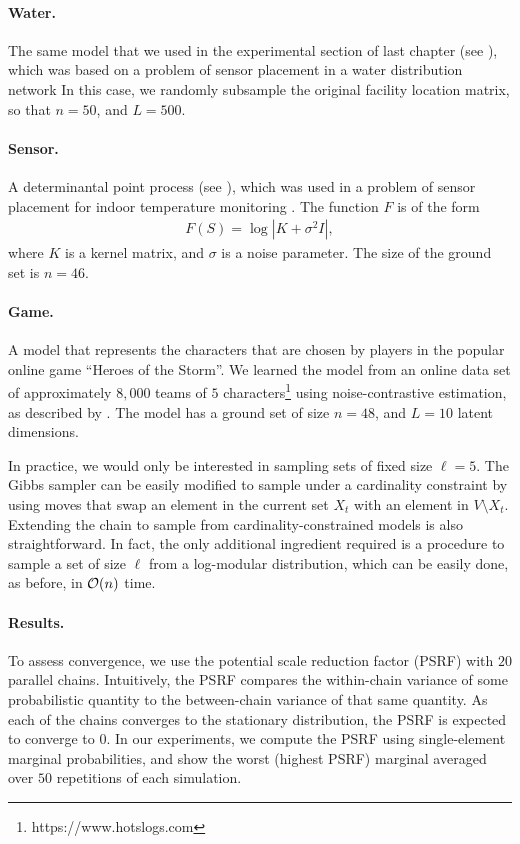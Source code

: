 \paragraph{\textsf{Water}.} The same \flid{} model that we used in the experimental section of last chapter (see ), which was based on a problem of sensor placement in a water distribution network \citep{krause08}
In this case, we randomly subsample the original facility location matrix, so that $n = 50$, and $L = 500$.

\paragraph{\textsf{Sensor}.} A determinantal point process (see ), which was used in a problem of sensor placement for indoor temperature monitoring \citep{guestrin05}.
The function $F$ is of the form
\begin{align*}
F(S) = \log |K + \sigma^2 I|,
\end{align*}
where $K$ is a kernel matrix, and $\sigma$ is a noise parameter.
The size of the ground set is $n = 46$.

\paragraph{\textsf{Game}.} A \flid{} model that represents the characters that are chosen by players in the popular online game ``Heroes of the Storm''.
We learned the model from an online data set of approximately $8,000$ teams of $5$ characters\footnote{https://www.hotslogs.com} using noise-contrastive estimation, as described by \cite{tschiatschek16}.
The model has a ground set of size $n = 48$, and $L = 10$ latent dimensions.

In practice, we would only be interested in sampling sets of fixed size $\ell = 5$.
The Gibbs sampler can be easily modified to sample under a cardinality constraint by using moves that swap an element in the current set $X_t$ with an element in $V \setminus X_t$.
Extending the \Ms{} chain to sample from cardinality-constrained models is also straightforward.
In fact, the only additional ingredient required is a procedure to sample a set of size $\ell$ from a log-modular distribution, which can be easily done, as before, in $\mathcal{O}(n)$ time.

\paragraph{Results.}
To assess convergence, we use the potential scale reduction factor (PSRF) \citep{brooks11} with $20$ parallel chains.
Intuitively, the PSRF compares the within-chain variance of some probabilistic quantity to the between-chain variance of that same quantity.
As each of the chains converges to the stationary distribution, the PSRF is expected to converge to $0$.
In our experiments, we compute the PSRF using single-element marginal probabilities, and show the worst (highest PSRF) marginal averaged over $50$ repetitions of each simulation.

